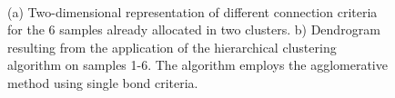 \documentclass{ieeeaccess}
\begin{document}

\begin{figure}[ht]
    \begin{center}
        \mbox{
        }
        \mbox{
        }
    \end{center}
    \caption{(a) Two-dimensional representation of different connection criteria for the 6 samples already allocated in two clusters. b) Dendrogram resulting from the application of the hierarchical clustering algorithm on samples 1-6. The algorithm employs the agglomerative method using single bond criteria.}
    \label{fig:hiearquico}
\end{figure}
\end{document}
